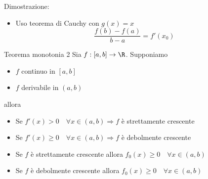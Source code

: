 Dimostrazione:
\begin{itemize}
	\item Uso teorema di Cauchy con $g\left( x \right) =x$
	      \[
		      \frac{f\left( b \right) -f\left( a \right) }{b-a}=f'\left( x_0 \right)
	      \]
\end{itemize}
\begin{teorema}{Teorema monotonia 2}
	Sia $f:\left[ a,b \right] \to \R$. Supponiamo
	\begin{itemize}
		\item $f$ continuo in $\left[ a,b \right] $
		\item $f$ derivabile in $\left( a,b \right) $
	\end{itemize}
	allora
	\begin{itemize}
		\item Se $ f'\left( x \right) > 0 \quad \forall x \in  \left( a,b \right) \Rightarrow f$ è strettamente crescente
		\item Se $f'\left( x \right) \ge 0 \quad \forall x \in  \left( a,b \right) \Rightarrow f$ è debolmente crescente
		\item Se $f$ è strettamente crescente allora $ f_0\left( x \right)  \ge 0 \quad  \forall x \in  \left( a,b \right) $
		\item Se $f$ è debolmente crescente allora $ f_0\left( x \right) \ge 0 \quad \forall x \in  \left( a,b \right) $
	\end{itemize}
\end{teorema}

